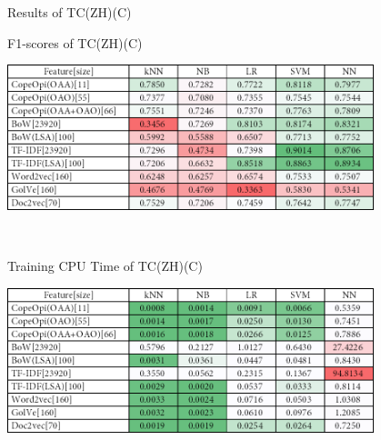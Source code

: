 \begin{table}
\caption{Results of TC(ZH)(C)}
\label{tab:tc_zh_c}
\centering
\begin{subtable}{\textwidth}
	\centering
	\caption{F1-scores of TC(ZH)(C)}
	\includegraphics[width=0.8\textwidth]{./figure/02B3.png}
\end{subtable}\\[1em]
\begin{subtable}{\textwidth}
	\centering
	\caption{Training CPU Time of TC(ZH)(C)}
	\includegraphics[width=0.8\textwidth]{./figure/02B3t.png}
\end{subtable}
\end{table}
